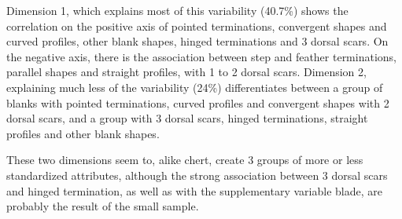 \documentclass[12pt,twoside]{reedthesis}
\begin{document}
Dimension 1, which explains most of this variability (40.7\%) shows the correlation on the positive axis of pointed terminations, convergent shapes and curved profiles, other blank shapes, hinged terminations and 3 dorsal scars. On the negative axis, there is the association between step and feather terminations, parallel shapes and straight profiles, with 1 to 2 dorsal scars.
Dimension 2, explaining much less of the variability (24\%) differentiates between a group of blanks with pointed terminations, curved profiles and convergent shapes with 2 dorsal scars, and a group with 3 dorsal scars, hinged terminations, straight profiles and other blank shapes.

These two dimensions seem to, alike chert, create 3 groups of more or less standardized attributes, although the strong association between 3 dorsal scars and hinged termination, as well as with the supplementary variable blade, are probably the result of the small sample.
\end{document}
